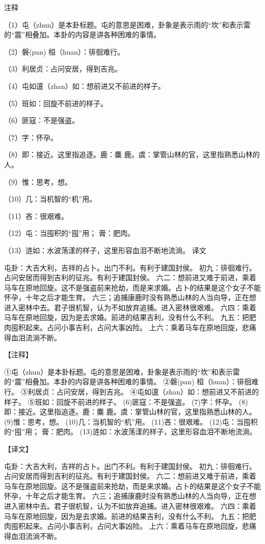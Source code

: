 \documentclass[a4paper,12pt,UTF8,twoside]{ctexbook}
\begin{document}
注释

（1）屯（zhun）是本卦标题。屯的意思是困难，卦象是表示雨的“坎”和表示雷的“震”相叠加。本卦的内容是讲各种困难的事情。

（2）磐(pan) 桓（huan）：徘徊难行。

（3）利居贞：占问安居，得到吉兆。

（4）屯如邅（zhan）如：想前进又不前进的样子。

（5）班如：回旋不前进的样子。

（6）匪寇：不是强盗。

（7）字：怀孕。

（8）即：接近。这里指追逐。鹿：麋 鹿。虞：掌管山林的官，这里指熟悉山林的人。

（9）惟：思考，想。

（10）几：当机智的“机”用。

（11）吝：很艰难。

（12）屯：当囤积的“囤”用； 膏：肥肉。

（13）涟如：水波荡漾的样子，这里形容血泪不断地流淌。
译文

屯卦：大吉大利，吉祥的占卜。出门不利。有利于建国封侯。 初九：徘徊难行。占问安居而得到吉利的征兆。有利于建国封侯。 六二：想前进又难于前进，乘着马车在原地回旋。这不是强盗前来抢劫，而是来求婚。占卜的结果是这个女子不能怀孕，十年之后才能生育。 六三；追捕康鹿时没有熟悉山林的人当向导，正在想进入密林中去。君子很机智，认为不如放弃追捕。进入密林很艰难。 六四：乘着马车在原地回旋，因为是去求婚。前进的结果吉利，没有什么不利。 九五：把肥肉囤积起来。占问小事吉利，占问大事凶险。 上六：乘着马车在原地回旋，悲痛得血泪流淌不断。



【注释】

①屯（zhun）是本卦标题。屯的意思是困难，卦象是表示雨的“坎”和表示雷的“震”相叠加。本卦的内容是讲各种困难的事情。
②磐(pan) 桓（huan）：徘徊难行。
③利居贞：占问安居，得到吉兆。
④屯如邅（zhan）如：想前进又不前进的样子。
⑤班如：回旋不前进的样子。
(6)匪寇：不是强盗。
(7)字：怀孕。
(8)即：接近。这里指追逐。鹿：麋 鹿。虞：掌管山林的官，这里指熟悉山林的人。
(9)惟：思考，想。
(10)几：当机智的“机”用。
(11)吝：很艰难。
(12)屯：当囤积的“囤”用； 膏：肥肉。
(13)涟如：水波荡漾的样子，这里形容血泪不断地流淌。

【译文】

屯卦：大吉大利，吉祥的占卜。出门不利。有利于建国封侯。
初九：徘徊难行。占问安居而得到吉利的征兆。有利于建国封侯。
六二：想前进又难于前进，乘着马车在原地回旋。这不是强盗前来抢劫，而是来求婚。占卜的结果是这个女子不能怀孕，十年之后才能生育。
六三；追捕康鹿时没有熟悉山林的人当向导，正在想进入密林中去。君子很机智，认为不如放弃追捕。进入密林很艰难。
六四：乘着马车在原地回旋，因为是去求婚。前进的结果吉利，没有什么不利。
九五：把肥肉囤积起来。占问小事吉利，占问大事凶险。
上六：乘着马车在原地回旋，悲痛得血泪流淌不断。
\end{document}
